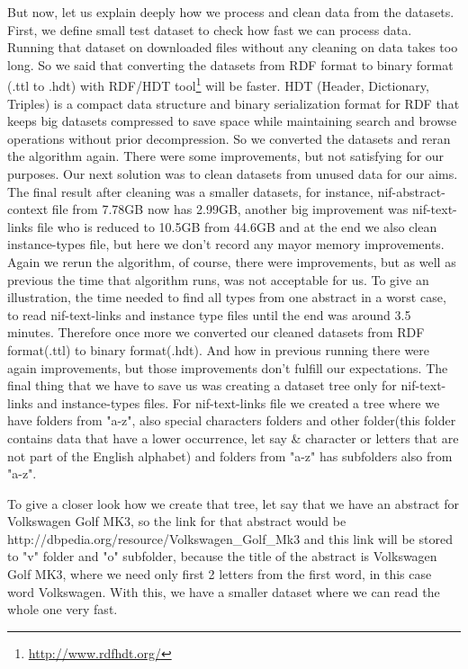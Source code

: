 \documentclass[thesis=M,english]{FITthesis}[2018/05/30]
\begin{document}
	But now, let us explain deeply how we process and clean data from the datasets. First, we define small test dataset to check how fast we can process data. Running that dataset on downloaded files without any cleaning on data takes too long. So we said that converting the datasets from RDF format to binary format (.ttl to .hdt) with RDF/HDT tool\footnote{\url{http://www.rdfhdt.org/}} will be faster. HDT (Header, Dictionary, Triples)\cite{FMPGPA:13} is a compact data structure and binary serialization format for RDF that keeps big datasets compressed to save space while maintaining search and browse operations without prior decompression. So we converted the datasets and reran the algorithm again. There were some improvements, but not satisfying for our purposes. Our next solution was to clean datasets from unused data for our aims. The final result after cleaning was a smaller datasets, for instance, nif-abstract-context file from 7.78GB now has 2.99GB, another big improvement was nif-text-links file who is reduced to 10.5GB from 44.6GB and at the end we also clean instance-types file, but here we don't record any mayor memory improvements. Again we rerun the algorithm, of course, there were improvements, but as well as previous the time that algorithm runs, was not acceptable for us. To give an illustration, the time needed to find all types from one abstract in a worst case, to read nif-text-links and instance type files until the end was around 3.5 minutes. Therefore once more we converted our cleaned datasets from RDF format(.ttl) to binary format(.hdt). And how in previous running there were again improvements, but those improvements don't fulfill our expectations. The final thing that we have to save us was creating a dataset tree only for nif-text-links and instance-types files. For nif-text-links file we created a tree where we have folders from "a-z", also special characters folders and other folder(this folder contains data that have a lower occurrence, let say \& character or letters that are not part of the English alphabet) and folders from "a-z" has subfolders also from "a-z". 

	To give a closer look how we create that tree, let say that we have an abstract for Volkswagen Golf MK3, so the link for that abstract would be http://dbpedia.org/resource/Volkswagen\_Golf\_Mk3 and this link will be stored to "v" folder and "o" subfolder, because the title of the abstract is Volkswagen Golf MK3, where we need only first 2 letters from the first word, in this case word Volkswagen. With this, we have a smaller dataset where we can read the whole one very fast.
\end{document}
